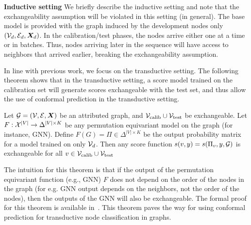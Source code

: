 \noindent \textbf{Inductive setting}
We briefly describe the inductive setting and note that the exchangeability assumption will be violated in this setting (in general).
The base model is provided with the graph induced by the development nodes only $({\mathcal{V}}_d, {\mathcal{E}}_d, {\bm{X}}_d)$.
In the calibration/test phases, the nodes arrive either one at a time or in batches.
Thus, nodes arriving later in the sequence will have access to neighbors that arrived earlier, breaking the exchangeability assumption.

In line with previous work, we focus on the transductive setting.
The following theorem shows that in the transductive setting, a score model trained on the calibration set will generate scores exchangeable with the test set, and thus allow the use of conformal prediction in the transductive setting.

\begin{theorem}
    Let ${\mathcal{G}} = ({\mathcal{V}}, {\mathcal{E}}, {\bm{X}})$ be an attributed graph, and ${\mathcal{V}}_{\text{calib}} \cup {\mathcal{V}}_{\text{test}}$ be exchangeable.
    Let $F: {\mathcal{X}}^{|V|} \rightarrow \Delta^{|V| \times K}$ be any permutation equivariant model on the graph (for instance, GNN). 
    Define $F(G) = \Pi \in \Delta^{|V| \times K}$ be the output probability matrix for a model trained on only ${\mathcal{V}}_d$.
    Then any score function $s(v, y) = s(\Pi_v, y, {\mathcal{G}})$ is exchangeable for all $v \in {\mathcal{V}}_{\text{calib}} \cup{\mathcal{V}}_{\text{test}} $
    \label{thm:exchangeability}
\end{theorem}
The intuition for this theorem is that if the output of the permutation equivariant function (e.g., GNN) $F$ does not depend on the order of the nodes in the graph (for e.g. GNN output depends on the neighbors, not the order of the nodes), then the outputs of the GNN will also be exchangeable.
The formal proof for this theorem is available in~\citet{zargarbashi23conformal,huang2024uncertainty}.
This theorem paves the way for using conformal prediction for transductive node classification in graphs.


